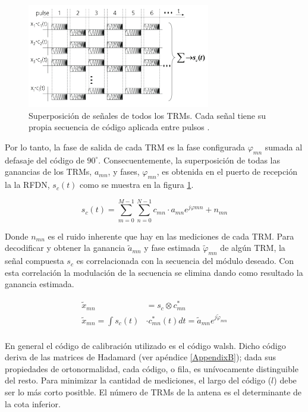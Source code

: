 \begin{figure}[!H]
 \centering
 \includegraphics[width=8cm]{gfx/superposition_signals_classic.png}
 \caption{Superposición de señales de todos los TRMs. Cada señal tiene su propia secuencia de código aplicada entre pulsos \cite{Br2007}.}
 \label{fig:sup_sign_classic}
\end{figure}

Por lo tanto, la fase de salida de cada TRM es la fase configurada $\varphi_{mn}$ sumada al defasaje del código de 
$90^{\circ}$. Consecuentemente, la superposición de todas las ganancias de los TRMs, $a_{mn}$, y fases, $\varphi_{mn}$,
es obtenida en el puerto de recepción la la RFDN, $s_c(t)$ como se muestra en la figura \ref{fig:sup_sign_classic}.

\begin{equation}
	s_c(t) = \sum_{m=0}^{M-1}\sum_{n=0}^{N-1}c_{mn}\cdot a_{mn}e^{j\varphi{mn}} + n_{mn}
\end{equation}

Donde $n_{mn}$ es el ruido inherente que hay en las mediciones de cada TRM. Para decodificar y obtener la ganancia 
$\tilde{a}_{mn}$ y fase estimada $\tilde\varphi_{mn}$ de algún TRM, la señal compuesta $s_c$ es correlacionada con 
la secuencia del módulo deseado. Con esta correlación la modulación de la secuencia se elimina dando como resultado
la ganancia estimada.

\begin{equation}
\begin{aligned}
	\tilde{x}_{mn} &= s_c \otimes c^*_{mn} \\
	\tilde{x}_{mn} = \int s_c(t) &\cdot c^*_{mn}(t) dt = \tilde{a}_{mn}e^{j\tilde{\varphi}_{mn}} \\
\end{aligned}
\label{eq:}
\end{equation}

En general el código de calibración utilizado es el código walsh. Dicho código deriva de las matrices de Hadamard (ver 
apéndice \ref{AppendixB}); dada sus propiedades de ortonormalidad, cada código, o fila, es unívocamente distinguible del 
resto. Para minimizar la cantidad de mediciones, el largo del código ($l$) debe ser lo más corto positble. El número de 
TRMs de la antena es el determinante de la cota inferior.

